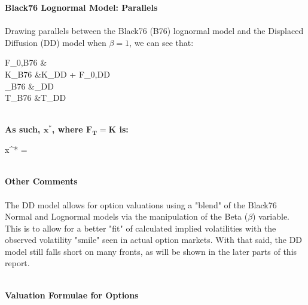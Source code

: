 \documentclass{article}
\begin{document}
\begin{minipage}[t]{0.42\textwidth}
\begin{tcolorbox}[height=15.5cm,boxsep=5pt,arc=0pt,auto outer arc,colback=white,colframe=black]
	\noindent \textbf{Black76 Lognormal Model: Parallels}\\ \\
	Drawing parallels between the Black76 (B76) lognormal model and the Displaced Diffusion (DD) model when $\beta = 1$, we can see that:
	\begin{flalign*}
	F_{0,\textnormal{B76}} &\to {}\\ K_{\textnormal{B76}} &\to K_{\textnormal{DD}} +  F_{0,\textnormal{DD}}\\
	\sigma_{\textnormal{B76}} &\to \beta \sigma_{\textnormal{DD}}\\
	T_{\textnormal{B76}} &\to T_{\textnormal{DD}}
	\end{flalign*}\\
	\noindent \textbf{As such, $\boldsymbol{x^*}$, where $\boldsymbol{F_T=K}$ is:}
	\begin{flalign*}
	x^* = 
	\end{flalign*}\\
	\textbf{Other Comments}\\ \\
	The DD model allows for option valuations using a "blend" of the Black76 Normal and Lognormal models via the manipulation of the Beta ($\beta$) variable. This is to allow for a better "fit" of calculated implied volatilities with the observed volatility "smile" seen in actual option markets. With that said, the DD model still falls short on many fronts, as will be shown in the later parts of this report.
\end{tcolorbox}
\end{minipage}\\

\noindent \textbf{Valuation Formulae for Options}
\\

\end{document}
